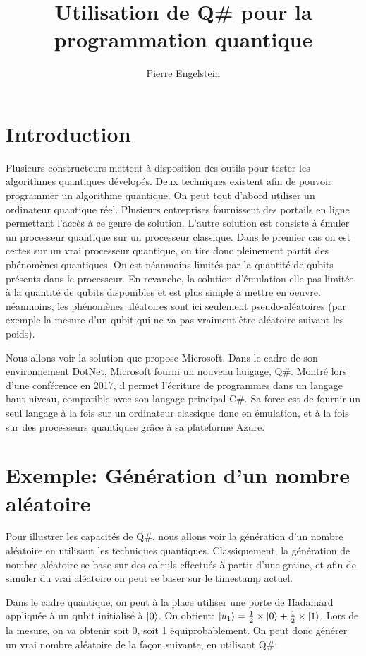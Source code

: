 \documentclass[12pt,a4paper]{article}
\title{Utilisation de Q\# pour la programmation quantique}
\author{Pierre Engelstein}
\date{}
\DeclarePairedDelimiter\ket{\lvert}{\rangle}
\begin{document}
\maketitle

\section{Introduction}
Plusieurs constructeurs mettent à disposition des outils pour tester les algorithmes quantiques dévelopés. Deux techniques existent afin de pouvoir programmer un algorithme quantique. On peut tout d'abord utiliser un ordinateur quantique réel. Plusieurs entreprises fournissent des portails en ligne permettant l'accès à ce genre de solution. L'autre solution est consiste à émuler un processeur quantique sur un processeur classique. Dans le premier cas on est certes sur un vrai processeur quantique, on tire donc pleinement partit des phénomènes quantiques. On est néanmoins limités par la quantité de qubits présents dans le processeur. En revanche, la solution d'émulation elle pas limitée à la quantité de qubits disponibles et est plus simple à mettre en oeuvre. néanmoins, les phénomènes aléatoires sont ici seulement pseudo-aléatoires (par exemple la mesure d'un qubit qui ne va pas vraiment être aléatoire suivant les poids).

Nous allons voir la solution que propose Microsoft. Dans le cadre de son environnement DotNet, Microsoft fourni un nouveau langage, Q\#. Montré lors d'une conférence en 2017, il permet l'écriture de programmes dans un langage haut niveau, compatible avec son langage principal C\#. Sa force est de fournir un seul langage à la fois sur un ordinateur classique donc en émulation, et à la fois sur des processeurs quantiques grâce à sa plateforme Azure.

\section{Exemple: Génération d'un nombre aléatoire}
Pour illustrer les capacités de Q\#, nous allons voir la génération d'un nombre aléatoire en utilisant les techniques quantiques. Classiquement, la génération de nombre aléatoire se base sur des calculs effectués à partir d'une graine, et afin de simuler du vrai aléatoire on peut se baser sur le timestamp actuel.

Dans le cadre quantique, on peut à la place utiliser une porte de Hadamard appliquée à un qubit initialisé à $\ket{0}$. On obtient: $\ket{u_1} = \frac{1}{2} \times \ket{0} + \frac{1}{2} \times \ket{1}$. Lors de la mesure, on va obtenir soit 0, soit 1 équiprobablement. On peut donc générer un vrai nombre aléatoire de la façon suivante, en utilisant Q\#:
\end{document}
